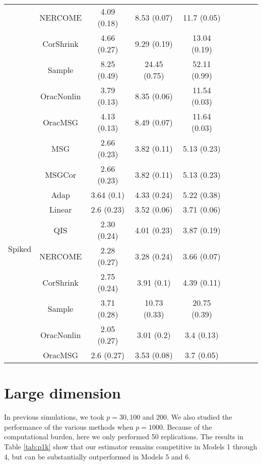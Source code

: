\documentclass{article}
\begin{document}
\begin{table}[H]
{\begin{tabular}{ccccccccc}
 & NERCOME        & 4.09 (0.18) & 8.53 (0.07)  & 11.7 (0.05)  \\
 & CorShrink      & 4.66 (0.27) & 9.29 (0.19)  & 13.04 (0.19) \\
 & Sample            & 8.25 (0.49) & 24.45 (0.75) & 52.11 (0.99) \\
 & OracNonlin & 3.79 (0.13) & 8.35 (0.06)  & 11.54 (0.03) \\
 & OracMSG  & 4.13 (0.13) & 8.49 (0.07)  & 11.64 (0.03) \\  \midrule
\multirow{10}{*}{Spiked}  
  & MSG & 2.66 (0.23) & 3.82 (0.11)  & 5.13 (0.23)  \\
 & MSGCor   & 2.66 (0.23) & 3.82 (0.11)  & 5.13 (0.23)  \\
 & Adap     & 3.64 (0.1)  & 4.33 (0.24)  & 5.22 (0.38)  \\
 & Linear         & 2.6 (0.23)  & 3.52 (0.06)  & 3.71 (0.06)  \\
 & QIS            & 2.30 (0.24) & 4.01 (0.23)  & 3.87 (0.19) \\
 & NERCOME        & 2.28 (0.27) & 3.28 (0.24)  & 3.66 (0.07)  \\
 & CorShrink      & 2.75 (0.24) & 3.91 (0.1)   & 4.39 (0.11)  \\
 & Sample            & 3.71 (0.28) & 10.73 (0.33) & 20.75 (0.39) \\
 & OracNonlin & 2.05 (0.27) & 3.01 (0.2)   & 3.4 (0.13)   \\
 & OracMSG  & 2.6 (0.27)  & 3.53 (0.08)  & 3.7 (0.05)  \\ \bottomrule
\end{tabular}%
}
\end{table}

\section{Large dimension}

In previous simulations, we took $p=30,100$ and 200. We also studied the performance of the various methods when $p=1000$. Because of the computational burden, here we only performed 50 replications. The results in Table \ref{tab:p1k} show that our estimator remains competitive in Models 1 through 4, but can be substantially outperformed in Models 5 and 6.
\end{document}
